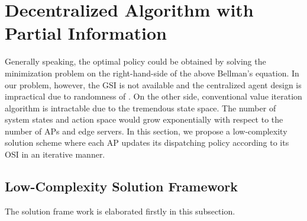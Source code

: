 \section{Decentralized Algorithm with Partial Information}
Generally speaking, the optimal policy could be obtained by solving the minimization problem on the right-hand-side of the above Bellman's equation. %
In our problem, however, the GSI is not available and the centralized agent design is impractical due to randomness of \brlatency.
On the other side, conventional value iteration algorithm is intractable due to the tremendous state space.
The number of system states and action space would grow exponentially with respect to the number of APs and edge servers.
In this section, we propose a low-complexity solution scheme where each AP updates its dispatching policy according to its OSI in an iterative manner.

\subsection{Low-Complexity Solution Framework}

The solution frame work is elaborated firstly in this subsection.

